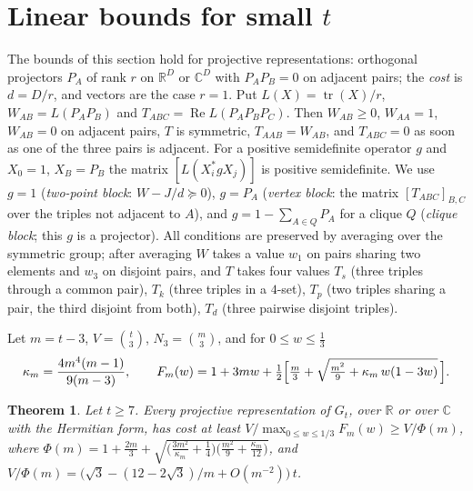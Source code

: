 \documentclass[11pt]{article}
\newtheorem{theorem}{Theorem}
\theoremstyle{remark}
\newcommand{\R}{\mathbb{R}}
\newcommand{\C}{\mathbb{C}}
\newcommand{\tr}{\operatorname{tr}}
\newcommand{\Gt}{G_t}
\begin{document}
\section{Linear bounds for small $t$}\label{sec:linear}
The bounds of this section hold for projective representations: orthogonal projectors $P_A$ of rank $r$ on
$\R^D$ or $\C^D$ with $P_AP_B=0$ on adjacent pairs; the \emph{cost} is $d=D/r$, and vectors are the case
$r=1$. Put $L(X)=\tr(X)/r$, $W_{AB}=L(P_AP_B)$ and $T_{ABC}=\operatorname{Re}L(P_AP_BP_C)$. Then
$W_{AB}\ge0$, $W_{AA}=1$, $W_{AB}=0$ on adjacent pairs, $T$ is symmetric, $T_{AAB}=W_{AB}$, and $T_{ABC}=0$ as
soon as one of the three pairs is adjacent. For a positive semidefinite operator $g$ and $X_0=1$, $X_B=P_B$
the matrix $[L(X_i^*gX_j)]$ is positive semidefinite. We use $g=1$ (\emph{two-point block}: $W-J/d\succeq0$),
$g=P_A$ (\emph{vertex block}: the matrix $[T_{ABC}]_{B,C}$ over the triples not adjacent to $A$), and
$g=1-\sum_{A\in Q}P_A$ for a clique $Q$ (\emph{clique block}; this $g$ is a projector). All conditions are preserved by averaging over
the symmetric group; after averaging $W$ takes a value $w_1$ on pairs sharing two elements and $w_3$ on
disjoint pairs, and $T$ takes four values $T_s$ (three triples through a common pair), $T_k$ (three triples in
a $4$-set), $T_p$ (two triples sharing a pair, the third disjoint from both), $T_d$ (three pairwise disjoint
triples).

Let $m=t-3$, $V=\binom t3$, $N_3=\binom m3$, and for $0\le w\le\tfrac13$
\[ \kappa_m=\frac{4m^4(m-1)}{9(m-3)},\qquad
F_m(w)=1+3mw+\tfrac12\Bigl[\tfrac m3+\sqrt{\tfrac{m^2}9+\kappa_m\,w(1-3w)}\,\Bigr]. \]

\begin{theorem}\label{thm:A}
Let $t\ge7$. Every projective representation of $\Gt$, over $\R$ or over $\C$ with the Hermitian form, has cost
at least $V/\max_{0\le w\le1/3}F_m(w)\ge V/\Phi(m)$, where
$\Phi(m)=1+\tfrac{2m}3+\sqrt{\bigl(\tfrac{3m^2}{\kappa_m}+\tfrac14\bigr)\bigl(\tfrac{m^2}9+\tfrac{\kappa_m}{12}\bigr)}$, and
$V/\Phi(m)=\bigl(\sqrt3-(12-2\sqrt3)/m+O(m^{-2})\bigr)\,t$.
\end{theorem}
\end{document}
